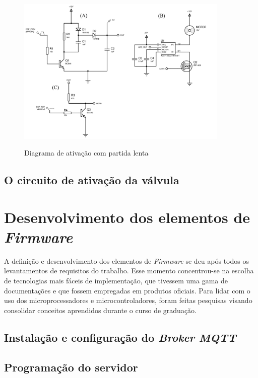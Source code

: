 \begin{figure}[H]
	\centering
	\caption{Diagrama de ativação com partida lenta}
	\includegraphics[width=0.9\textwidth]{figuras/diagrama_ativação_bomba.png}
	\label{fig:diagramaproteus}
\end{figure} 



\subsection{O circuito de ativação da válvula}

\section{Desenvolvimento dos elementos de \textit{Firmware}}
\label{sec: dev_ele_fw}

A definição e desenvolvimento dos elementos de \textit{Firmware} se deu após todos os levantamentos de requisitos do trabalho. Esse momento concentrou-se na escolha de tecnologias mais fáceis de implementação, que tivessem uma gama de documentações e que fossem empregadas em produtos oficiais. Para lidar com o uso dos microprocessadores e microcontroladores, foram feitas pesquisas visando consolidar conceitos aprendidos durante o curso de graduação.

\subsection {Instalação e configuração do \textit{Broker MQTT}}
\subsection {Programação do servidor}
